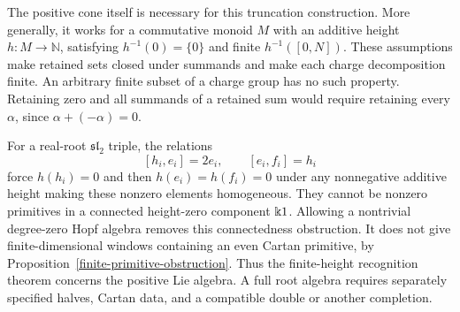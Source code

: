 The positive cone itself is necessary for this truncation construction.
More generally, it works for a commutative monoid $M$ with an additive
height $h:M\to\mathbb N$, satisfying $h^{-1}(0)=\{0\}$ and finite
$h^{-1}([0,N])$.  These assumptions make retained sets closed under
summands and make each charge decomposition finite.
An arbitrary finite subset of a charge group has no such property.
Retaining zero and all summands of a retained sum would require retaining
every $\alpha$, since $\alpha+(-\alpha)=0$.

For a real-root $\mathfrak{sl}_2$ triple, the relations
\[
 [h_i,e_i]=2e_i,\qquad[e_i,f_i]=h_i
\]
force $h(h_i)=0$ and then $h(e_i)=h(f_i)=0$ under any nonnegative
additive height making these nonzero elements homogeneous.
They cannot be nonzero primitives in a connected height-zero component
$\Bbbk1$.  Allowing a nontrivial degree-zero Hopf algebra removes this
connectedness obstruction.  It does not give finite-dimensional windows
containing an even Cartan primitive, by
Proposition~\ref{finite-primitive-obstruction}.
Thus the finite-height recognition theorem concerns the positive Lie
algebra.  A full root algebra requires separately specified halves,
Cartan data, and a compatible double or another completion.
